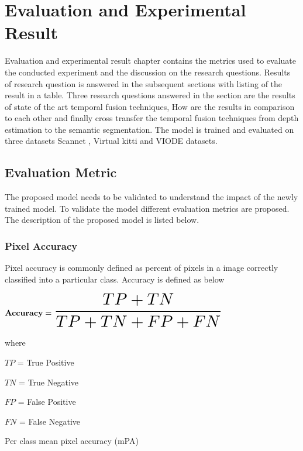 
\newcommand\scalemath[2]{\scalebox{#1}{\mbox{\ensuremath{\displaystyle #2}}}}



    \chapter{Evaluation and Experimental Result}
	\label{chap:evaluationandresult}
    Evaluation and experimental result chapter contains the metrics used to evaluate the conducted experiment and the discussion on the research questions. Results of research question is answered in the subsequent sections with listing of the result in a table. Three research questions answered in the section are the results of state of the art temporal fusion techniques, How are the results in comparison to each other and finally cross transfer the temporal fusion techniques from depth estimation to the semantic segmentation. The model is trained and evaluated on three datasets Scannet \cite{79_dai2017scannet}, Virtual kitti \cite{80_cabon2020vkitti2} and VIODE \cite{81_minodaRAL2021} datasets. 
    
    \section{Evaluation Metric}
    
    The proposed model needs to be validated to understand the impact of the newly trained model. To validate the model different evaluation metrics are proposed. The description of the proposed model is listed below.
    \subsection{Pixel Accuracy}
    
    Pixel accuracy is commonly defined as percent of pixels in a image correctly classified into a particular class. Accuracy is defined as below
    
    $
    {\bf Accuracy } = \scalemath{2}{\frac{TP+TN}{TP+TN+FP+FN}}
    $
    
    where
     
    $TP$ = True Positive 
    
    $TN$ = True Negative
    
    $FP$ = False Positive
    
    $FN$ = False Negative
    
    
    Per class mean pixel accuracy (mPA)
    
